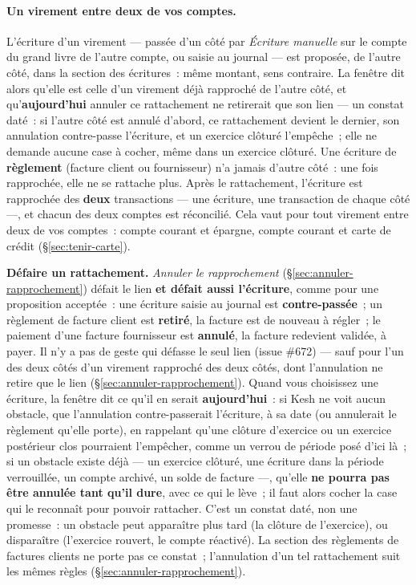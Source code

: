 \documentclass[a4paper,11pt,oneside]{article}
\begin{document}
\paragraph{Un virement entre deux de vos comptes.} L'écriture d'un virement --- passée d'un côté par \emph{Écriture manuelle} sur le compte du grand livre de l'autre compte, ou saisie au journal --- est proposée, de l'autre côté, dans la section des écritures~: même montant, sens contraire. La fenêtre dit alors qu'elle est celle d'un virement déjà rapproché de l'autre côté, et qu'\textbf{aujourd'hui} annuler ce rattachement ne retirerait que son lien --- un constat daté~: si l'autre côté est annulé d'abord, ce rattachement devient le dernier, son annulation contre-passe l'écriture, et un exercice clôturé l'empêche~; elle ne demande aucune case à cocher, même dans un exercice clôturé. Une écriture de \textbf{règlement} (facture client ou fournisseur) n'a jamais d'autre côté~: une fois rapprochée, elle ne se rattache plus. Après le rattachement, l'écriture est rapprochée des \textbf{deux} transactions --- une écriture, une transaction de chaque côté ---, et chacun des deux comptes est réconcilié. Cela vaut pour tout virement entre deux de vos comptes~: compte courant et épargne, compte courant et carte de crédit (\S\ref{sec:tenir-carte}).

\textbf{Défaire un rattachement.} \emph{Annuler le rapprochement} (\S\ref{sec:annuler-rapprochement}) défait le lien \textbf{et défait aussi l'écriture}, comme pour une proposition acceptée~: une écriture saisie au journal est \textbf{contre-passée}~; un règlement de facture client est \textbf{retiré}, la facture est de nouveau à régler~; le paiement d'une facture fournisseur est \textbf{annulé}, la facture redevient validée, à payer. Il n'y a pas de geste qui défasse le seul lien (issue \#672) --- sauf pour l'un des deux côtés d'un virement rapproché des deux côtés, dont l'annulation ne retire que le lien (\S\ref{sec:annuler-rapprochement}). Quand vous choisissez une écriture, la fenêtre dit ce qu'il en serait \textbf{aujourd'hui}~: si Kesh ne voit aucun obstacle, que l'annulation contre-passerait l'écriture, à sa date (ou annulerait le règlement qu'elle porte), en rappelant qu'une clôture d'exercice ou un exercice postérieur clos pourraient l'empêcher, comme un verrou de période posé d'ici là~; si un obstacle existe déjà --- un exercice clôturé, une écriture dans la période verrouillée, un compte archivé, un solde de facture ---, qu'elle \textbf{ne pourra pas être annulée tant qu'il dure}, avec ce qui le lève~; il faut alors cocher la case qui le reconnaît pour pouvoir rattacher. C'est un constat daté, non une promesse~: un obstacle peut apparaître plus tard (la clôture de l'exercice), ou disparaître (l'exercice rouvert, le compte réactivé). La section des règlements de factures clients ne porte pas ce constat~; l'annulation d'un tel rattachement suit les mêmes règles (\S\ref{sec:annuler-rapprochement}).
\end{document}
